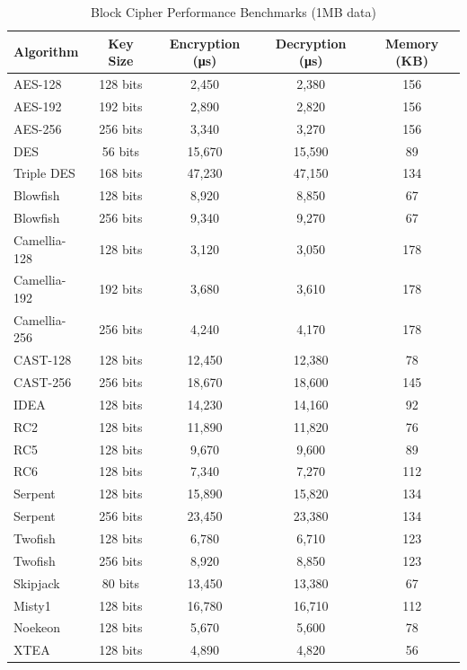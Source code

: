 \documentclass[12pt,a4paper]{article}
\begin{document}
\begin{table}[h]
\centering
\caption{Block Cipher Performance Benchmarks (1MB data)}
\begin{tabular}{|l|c|c|c|c|}
\hline
\textbf{Algorithm} & \textbf{Key Size} & \textbf{Encryption (μs)} & \textbf{Decryption (μs)} & \textbf{Memory (KB)} \\
\hline
AES-128 & 128 bits & 2,450 & 2,380 & 156 \\
AES-192 & 192 bits & 2,890 & 2,820 & 156 \\
AES-256 & 256 bits & 3,340 & 3,270 & 156 \\
\hline
DES & 56 bits & 15,670 & 15,590 & 89 \\
Triple DES & 168 bits & 47,230 & 47,150 & 134 \\
\hline
Blowfish & 128 bits & 8,920 & 8,850 & 67 \\
Blowfish & 256 bits & 9,340 & 9,270 & 67 \\
\hline
Camellia-128 & 128 bits & 3,120 & 3,050 & 178 \\
Camellia-192 & 192 bits & 3,680 & 3,610 & 178 \\
Camellia-256 & 256 bits & 4,240 & 4,170 & 178 \\
\hline
CAST-128 & 128 bits & 12,450 & 12,380 & 78 \\
CAST-256 & 256 bits & 18,670 & 18,600 & 145 \\
\hline
IDEA & 128 bits & 14,230 & 14,160 & 92 \\
RC2 & 128 bits & 11,890 & 11,820 & 76 \\
RC5 & 128 bits & 9,670 & 9,600 & 89 \\
RC6 & 128 bits & 7,340 & 7,270 & 112 \\
\hline
Serpent & 128 bits & 15,890 & 15,820 & 134 \\
Serpent & 256 bits & 23,450 & 23,380 & 134 \\
\hline
Twofish & 128 bits & 6,780 & 6,710 & 123 \\
Twofish & 256 bits & 8,920 & 8,850 & 123 \\
\hline
Skipjack & 80 bits & 13,450 & 13,380 & 67 \\
Misty1 & 128 bits & 16,780 & 16,710 & 112 \\
Noekeon & 128 bits & 5,670 & 5,600 & 78 \\
XTEA & 128 bits & 4,890 & 4,820 & 56 \\
\hline
\end{tabular}
\end{table}
\end{document}

